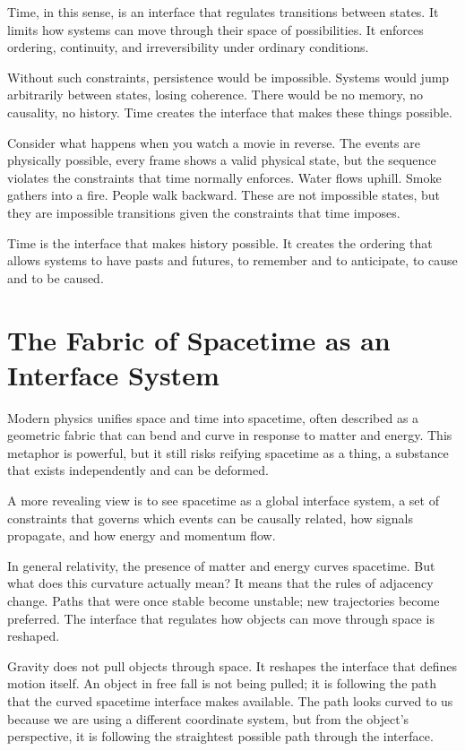 \documentclass[
  openright]{book}
\begin{document}
Time, in this sense, is an interface that regulates transitions between
states. It limits how systems can move through their space of
possibilities. It enforces ordering, continuity, and irreversibility
under ordinary conditions.

Without such constraints, persistence would be impossible. Systems would
jump arbitrarily between states, losing coherence. There would be no
memory, no causality, no history. Time creates the interface that makes
these things possible.

Consider what happens when you watch a movie in reverse. The events are
physically possible, every frame shows a valid physical state, but the
sequence violates the constraints that time normally enforces. Water
flows uphill. Smoke gathers into a fire. People walk backward. These are
not impossible states, but they are impossible transitions given the
constraints that time imposes.

Time is the interface that makes history possible. It creates the
ordering that allows systems to have pasts and futures, to remember and
to anticipate, to cause and to be caused.

\section{The Fabric of Spacetime as an Interface
System}\label{the-fabric-of-spacetime-as-an-interface-system}

Modern physics unifies space and time into spacetime, often described as
a geometric fabric that can bend and curve in response to matter and
energy. This metaphor is powerful, but it still risks reifying spacetime
as a thing, a substance that exists independently and can be deformed.

A more revealing view is to see spacetime as a global interface system,
a set of constraints that governs which events can be causally related,
how signals propagate, and how energy and momentum flow.

In general relativity, the presence of matter
and energy curves spacetime. But what does this curvature actually mean?
It means that the rules of adjacency change. Paths that were once stable
become unstable; new trajectories become preferred. The interface that
regulates how objects can move through space is reshaped.

Gravity does not pull objects through space. It reshapes the interface
that defines motion itself. An object in free fall is not being pulled;
it is following the path that the curved spacetime interface makes
available. The path looks curved to us because we are using a different
coordinate system, but from the object's perspective, it is following
the straightest possible path through the interface.
\end{document}
